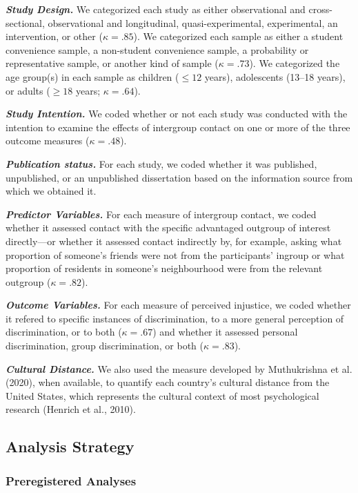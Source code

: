 \documentclass[twocolumn, 11pt, letterpaper]{article}
\begin{document}
\textbf{\emph{Study Design.}} We categorized each study as either
observational and cross-sectional, observational and longitudinal,
quasi-experimental, experimental, an intervention, or other
(\(\kappa = .85\)). We categorized each sample as either a student
convenience sample, a non-student convenience sample, a probability or
representative sample, or another kind of sample (\(\kappa = .73\)). We
categorized the age group(s) in each sample as children (\(\leq 12\)
years), adolescents (13--18 years), or adults (\(\geq 18\) years;
\(\kappa = .64\)).

\textbf{\emph{Study Intention.}} We coded whether or not each study was
conducted with the intention to examine the effects of intergroup
contact on one or more of the three outcome measures (\(\kappa = .48\)).

\textbf{\emph{Publication status.}} For each study, we coded whether it
was published, unpublished, or an unpublished dissertation based on the
information source from which we obtained it.

\textbf{\emph{Predictor Variables.}} For each measure of intergroup
contact, we coded whether it assessed contact with the specific
advantaged outgroup of interest directly---or whether it assessed
contact indirectly by, for example, asking what proportion of someone's
friends were not from the participants' ingroup or what proportion of
residents in someone's neighbourhood were from the relevant outgroup
(\(\kappa = .82\)).

\textbf{\emph{Outcome Variables.}} For each measure of perceived
injustice, we coded whether it refered to specific instances of
discrimination, to a more general perception of discrimination, or to
both (\(\kappa = .67\)) and whether it assessed personal discrimination,
group discrimination, or both (\(\kappa = .83\)).

\textbf{\emph{Cultural Distance.}} We also used the measure developed by
Muthukrishna et al. (2020), when available, to quantify each country's
cultural distance from the United States, which represents the cultural
context of most psychological research (Henrich et al., 2010).

\hypertarget{analysis-strategy}{%
\subsection{Analysis Strategy}\label{analysis-strategy}}

\hypertarget{preregistered-analyses}{%
\subsubsection{Preregistered Analyses}\label{preregistered-analyses}}
\end{document}
